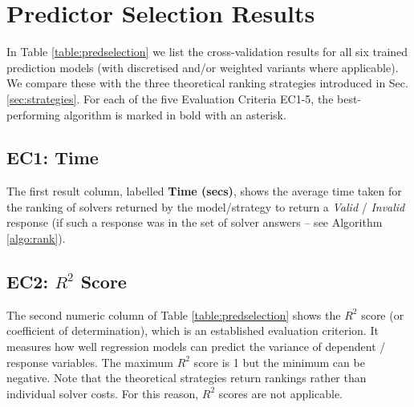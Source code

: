 \section{Predictor Selection Results}

\label{sec:pred-results}

In Table \ref{table:predselection} we list the cross-validation results for all six trained prediction models (with discretised and/or weighted variants where applicable).
We compare these  with the three theoretical ranking strategies introduced in Sec. \ref{sec:strategies}.
For each of the five Evaluation Criteria EC1-5, the best-performing algorithm is marked in bold with an asterisk. 

\subsection{EC1: Time}

The first result column, labelled \textbf{Time (secs)}, shows the average time taken for the ranking of solvers returned by the model/strategy to return a \textit{Valid} / \textit{Invalid} response (if such a response was in the set of solver answers -- see Algorithm \ref{algo:rank}).

\subsection{EC2: $R^2$ Score}

The second numeric column of Table \ref{table:predselection} shows
the $R^2$ score (or coefficient of determination), which is an established evaluation criterion. 
It measures how well regression models can predict the variance of dependent / response variables. 
The maximum $R^2$ score is 1 but the minimum can be negative. Note that the theoretical strategies return rankings rather than individual solver costs. 
For this reason, $R^2$ scores are not applicable.


